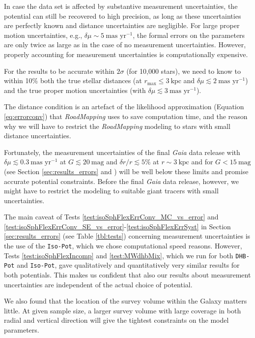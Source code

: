 \documentclass[iop,revtex4,numberedappendix,appendixfloats]{emulateapj}
\newcommand{\RM}{{\sl RoadMapping}}
\begin{document}
In case the data set is affected by substantive measurement uncertainties, the potential can still be recovered to high precision, as long as these uncertainties are perfectly known and distance uncertainties are negligible. For large proper motion uncertainties, e.g., $\delta \mu \sim 5~\text{mas yr}^{-1}$, the formal errors on the parameters are only twice as large as in the case of no measurement uncertainties. However, properly accounting for measurement uncertainties is computationally expensive.

For the results to be accurate within $2\sigma$ (for 10,000 stars), we need to know to within 10\% both the true stellar distances (at $r_\text{max} \leq 3~\text{kpc}$ and $\delta \mu \lesssim 2 ~ \text{mas yr}^{-1}$) and the true proper motion uncertainties (with $\delta \mu \lesssim 3 ~ \text{mas yr}^{-1}$).

The distance condition is an artefact of the likelihood approximation (Equation \eqref{eq:errorconv}) that \RM{} uses to save computation time, and the reason why we will have to restrict the \RM{} modeling to stars with small distance uncertainties.

Fortunately, the measurement uncertainties of the final \emph{Gaia} data release with $\delta\mu\lesssim0.3~\text{mas yr}^{-1}$ at $G\lesssim20~\text{mag}$ and $\delta r/r\lesssim5\%$ at $r\sim3~\text{kpc}$ and for $G<15~\text{mag}$ (see Section \ref{sec:results_errors} and \citealt{2014EAS....67...23D}) will be well below these limits and promise accurate potential constraints. Before the final \emph{Gaia} data release, however, we might have to restrict the modeling to suitable giant tracers with small uncertainties.

The main caveat of Tests \ref{test:isoSphFlexErrConv_MC_vs_error} and \ref{test:isoSphFlexErrConv_SE_vs_error}-\ref{test:isoSphFlexErrSyst} in Section \ref{sec:results_errors} (see Table \ref{tbl:tests}) concerning measurement uncertainties is the use of the \texttt{Iso-Pot}, which we chose computational speed reasons. However, Tests \ref{test:isoSphFlexIncomp} and \ref{test:MWdhbMix}, which we run for both \texttt{DHB-Pot} and \texttt{Iso-Pot}, gave qualitatively and quantitatively very similar results for both potentials. This makes us confident that also our results about measurement uncertainties are independent of the actual choice of potential.

We also found that the location of the survey volume within the Galaxy matters little. At given sample size, a larger survey volume with large coverage in both radial and vertical direction will give the tightest constraints on the model parameters.
\end{document}
